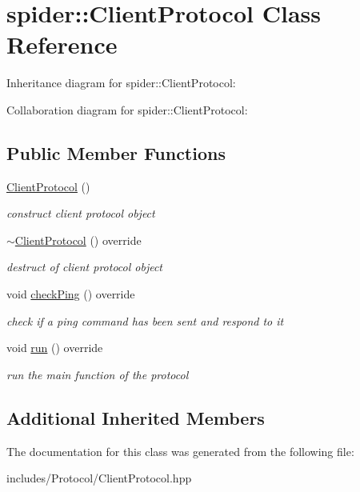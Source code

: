\hypertarget{classspider_1_1_client_protocol}{}\section{spider\+:\+:Client\+Protocol Class Reference}
\label{classspider_1_1_client_protocol}


Inheritance diagram for spider\+:\+:Client\+Protocol\+:


Collaboration diagram for spider\+:\+:Client\+Protocol\+:
\subsection*{Public Member Functions}
\begin{DoxyCompactItemize}
\item 
\mbox{\label{classspider_1_1_client_protocol_a99b5dc9ff233b3ef65ab3b6507ebc0b1}} 
\hyperlink{classspider_1_1_client_protocol_a99b5dc9ff233b3ef65ab3b6507ebc0b1}{Client\+Protocol} ()
\begin{DoxyCompactList}\small\item\em construct client protocol object \end{DoxyCompactList}\item 
\mbox{\label{classspider_1_1_client_protocol_abe6a83d162b5fbdd01b2a3e2bdca7d9b}} 
\hyperlink{classspider_1_1_client_protocol_abe6a83d162b5fbdd01b2a3e2bdca7d9b}{$\sim$\+Client\+Protocol} () override
\begin{DoxyCompactList}\small\item\em destruct of client protocol object \end{DoxyCompactList}\item 
\mbox{\label{classspider_1_1_client_protocol_a22ba498fcb876421408f36c8fdab88f2}} 
void \hyperlink{classspider_1_1_client_protocol_a22ba498fcb876421408f36c8fdab88f2}{check\+Ping} () override
\begin{DoxyCompactList}\small\item\em check if a ping command has been sent and respond to it \end{DoxyCompactList}\item 
\mbox{\label{classspider_1_1_client_protocol_a85f1850b7cfff1091984f8554308f5a4}} 
void \hyperlink{classspider_1_1_client_protocol_a85f1850b7cfff1091984f8554308f5a4}{run} () override
\begin{DoxyCompactList}\small\item\em run the main function of the protocol \end{DoxyCompactList}\end{DoxyCompactItemize}
\subsection*{Additional Inherited Members}


The documentation for this class was generated from the following file\+:\begin{DoxyCompactItemize}
\item 
includes/\+Protocol/Client\+Protocol.\+hpp\end{DoxyCompactItemize}
